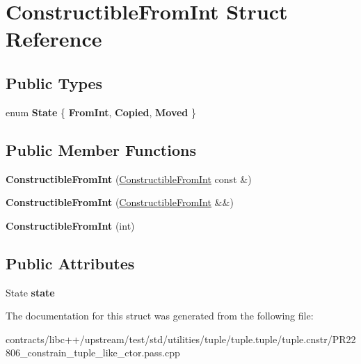 \hypertarget{struct_constructible_from_int}{}\section{Constructible\+From\+Int Struct Reference}
\label{struct_constructible_from_int}
\subsection*{Public Types}
\begin{DoxyCompactItemize}
\item 
\mbox{\label{struct_constructible_from_int_accba028e02212b51105a43d97a3774af}} 
enum {\bfseries State} \{ {\bfseries From\+Int}, 
{\bfseries Copied}, 
{\bfseries Moved}
 \}
\end{DoxyCompactItemize}
\subsection*{Public Member Functions}
\begin{DoxyCompactItemize}
\item 
\mbox{\label{struct_constructible_from_int_a9dc5397ba94b5a1df9a3a44e7b3bec40}} 
{\bfseries Constructible\+From\+Int} (\mbox{\hyperlink{struct_constructible_from_int}{Constructible\+From\+Int}} const \&)
\item 
\mbox{\label{struct_constructible_from_int_ab3552ef4db8a143e08df3f68a9c75bdc}} 
{\bfseries Constructible\+From\+Int} (\mbox{\hyperlink{struct_constructible_from_int}{Constructible\+From\+Int}} \&\&)
\item 
\mbox{\label{struct_constructible_from_int_a9ede5c34165a9b11c3c90492cde672cf}} 
{\bfseries Constructible\+From\+Int} (int)
\end{DoxyCompactItemize}
\subsection*{Public Attributes}
\begin{DoxyCompactItemize}
\item 
\mbox{\label{struct_constructible_from_int_a44514dc93b85fdb6ff5b6faf953e17c0}} 
State {\bfseries state}
\end{DoxyCompactItemize}


The documentation for this struct was generated from the following file\+:\begin{DoxyCompactItemize}
\item 
contracts/libc++/upstream/test/std/utilities/tuple/tuple.\+tuple/tuple.\+cnstr/P\+R22806\+\_\+constrain\+\_\+tuple\+\_\+like\+\_\+ctor.\+pass.\+cpp\end{DoxyCompactItemize}
